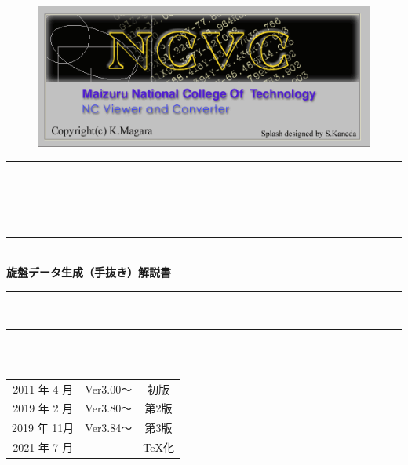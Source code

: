 
\vspace*{4zh}
\begin{figure}[H]
\centering
\includegraphics[scale=1.2]{logo.png}
\end{figure}

\vspace*{3zh}
\begin{center}
    \rule{6cm}{0.2zw}\\[-0.5zh]
    \rule{5cm}{0.1zw}\\[-0.5zh]
    \rule{4cm}{0.05zw}\\[1zh]
    {\Large \textbf{旋盤データ生成}}\textbf{（手抜き）}{\Large \textbf{解説書}}\\
    \rule{4cm}{0.05zw}\\[-0.5zh]
    \rule{5cm}{0.1zw}\\[-0.5zh]
    \rule{6cm}{0.2zw}

    \vspace*{7cm}
    \begin{table}[H]
        \centering
        \begin{tabular}{ccc}
            2011 年 4 月 & Ver3.00～ & 初版\\
            2019 年 2 月 & Ver3.80～ & 第2版\\
            2019 年 11月 & Ver3.84～ & 第3版\\
            2021 年 7 月 & & \TeX 化
        \end{tabular}
    \end{table}
\end{center}
